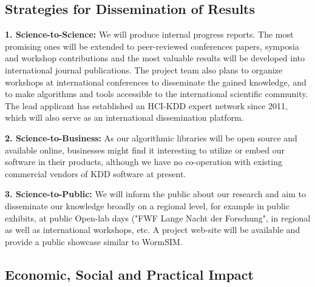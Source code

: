 \documentclass[a4paper,11pt]{article}
\begin{document}
\subsection{Strategies for Dissemination of Results}

\textbf{1. Science-to-Science:} We will produce internal progress reports. The most promising ones will be extended to peer-reviewed conferences papers, symposia and workshop contributions and the most valuable results will be developed into international journal publications. The project team also plans to organize workshops at international conferences to disseminate the gained knowledge, and to make algorithms and tools accessible to the international scientific community. The lead applicant has established an HCI-KDD expert network since 2011, which will also serve as an international dissemination platform.

\textbf{2. Science-to-Business:} As our algorithmic libraries will be open source and available online, businesses might find it interesting to utilize or embed our software in their products, although we have no co-operation with existing commercial vendors of KDD software at present.

\textbf{3. Science-to-Public:} We will inform the public about our research and aim to disseminate our knowledge broadly on a regional level, for example in public exhibits, at public Open-lab days ("FWF Lange Nacht der Forschung", in regional as well as international workshops, etc. A project web-site will be available and provide a public showcase similar to WormSIM.

\subsection{Economic, Social and Practical Impact}
\end{document}

